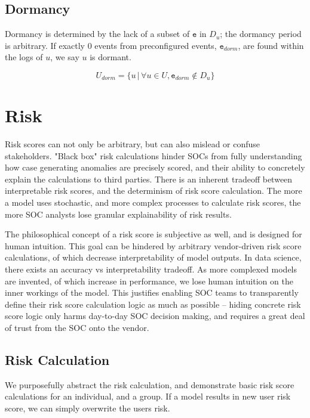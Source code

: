 \documentclass[10pt, titlepage, twocolumn]{article}
\begin{document}
\subsection{Dormancy}
Dormancy is determined by the lack of a subset of \(\texttt{e}\) in \(D_u\); the dormancy period is arbitrary. If exactly 0 events from preconfigured events, \(\texttt{e}_{dorm}\), are found within the logs of \(u\), we say \(u\) is dormant.

\begin{equation}
U_{dorm} = \{u \, \vert \, \forall u \in U, \texttt{e}_{dorm} \notin D_u \}
\end{equation}


\section{Risk}
Risk scores can not only be arbitrary, but can also mislead or confuse stakeholders. "Black box" risk calculations hinder SOCs from fully understanding how case generating anomalies are precisely scored, and their ability to concretely explain the calculations to third parties. There is an inherent tradeoff between interpretable risk scores, and the determinism of risk score calculation. The more a model uses stochastic, and more complex processes to calculate risk scores, the more SOC analysts lose granular explainability of risk results.

The philosophical concept of a risk score is subjective as well, and is designed for human intuition. This goal can be hindered by arbitrary vendor-driven risk score calculations, of which decrease interpretability of model outputs. In data science, there exists an accuracy vs interpretability tradeoff. As more complexed models are invented, of which increase in performance, we lose human intuition on the inner workings of the model. This justifies enabling SOC teams to transparently define their risk score calculation logic as much as possible -- hiding concrete risk score logic only harms day-to-day SOC decision making, and requires a great deal of trust from the SOC onto the vendor.

\subsection{Risk Calculation}
\hspace*{15pt}
We purposefully abstract the risk calculation, and demonstrate basic risk score calculations for an individual, and a group. If a model results in new user risk score, we can simply overwrite the users risk. 
\end{document}
